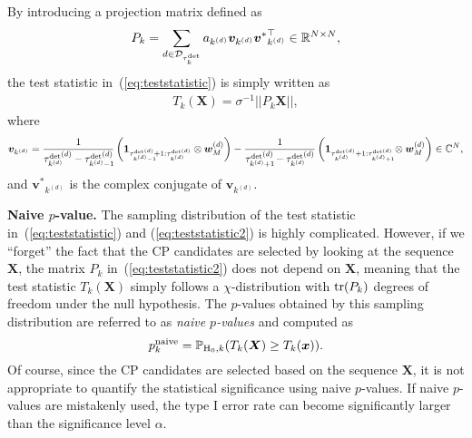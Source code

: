 %
By introducing a projection matrix defined as %
\begin{equation}
  P_k = \sum_{d \in \mathcal{D}_{\tau_k^{\text{det}}}} a_{k^{(d)}} {\bm{v}}_{k^{(d)}} {{\bm{v}}^{\ast}}_{k^{(d)}}^\top \in \mathbb{R}^{N \times N}, \notag
\end{equation}
the test statistic in~(\ref{eq:teststatistic}) is simply written as
\begin{align}
 \label{eq:teststatistic2}
 T_k(\bm{X}) = \sigma^{-1} ||P_k \bm{X}||,
\end{align}
where
\begin{equation}
  {\bm{v}}_{k^{(d)}} = {\frac{1}{{\tau_{k^{(d)}}^{\text{det}}}^{\hspace{-0.7mm}(d)} - {\tau_{k^{(d)}-1}^{\rm det}}^{\hspace{-4.3mm}(d)}}} \left(\bm{1}_{{\tau_{k^{(d)}-1}^{\rm det}}^{\hspace{-4.3mm}(d)}+1:{\tau_{k^{(d)}}^{\text{det}}}^{\hspace{-1.2mm}(d)}} \otimes \bm{w}_M^{(d)}\right) 
  - \frac{1}{{\tau_{k^{(d)}+1}^{\rm det}}^{\hspace{-4.3mm}(d)} - {\tau_{k^{(d)}}^{\text{det}}}^{\hspace{-0.7mm}(d)}} \left(\bm{1}_{{\tau_{k^{(d)}}^{\text{det}}}^{\hspace{-1.2mm}(d)}+1:{\tau_{k^{(d)}+1}^{\rm det}}^{\hspace{-4.3mm}(d)}} \otimes \bm{w}_M^{(d)}\right) \in \mathbb{C}^N, \notag
\end{equation}
and ${{\bm{v}}^{\ast}}_{k^{(d)}}$ is the complex conjugate of ${\bm{v}}_{k^{(d)}}$. 

\textbf{Naive $p$-value.}
%
The sampling distribution of the test statistic in~(\ref{eq:teststatistic}) and (\ref{eq:teststatistic2}) is highly complicated.
%
However, if we ``forget'' the fact that the CP candidates are selected by looking at the sequence $\bm X$, the matrix $P_k$ in~(\ref{eq:teststatistic2}) does not depend on $\bm X$, meaning that the test statistic $T_k(\bm X)$ simply follows a $\chi$-distribution with ${\rm tr}(P_k)$ degrees of freedom under the null hypothesis. 
%
The $p$-values obtained by this sampling distribution are referred to as \emph{naive $p$-values} and computed as 
\begin{equation}
  p_k^{\text{naive}} = \mathbb{P}_{\text{H}_0,k} (T_k(\bm{X}) \geq T_k(\bm{x})). \notag %
\end{equation}
%
Of course, since the CP candidates are selected based on the sequence \(\bm{X}\), it is not appropriate to quantify the statistical significance using naive $p$-values.  
%
If naive $p$-values are mistakenly used, the type I error rate can become significantly larger than the significance level $\alpha$.

